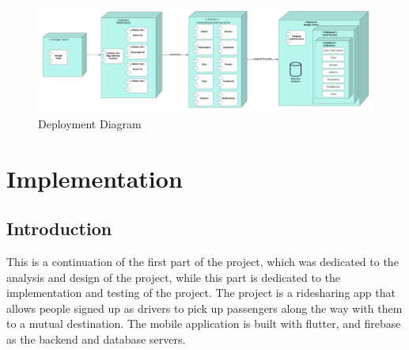 \documentclass[a4paper, 12pt]{report} %
\begin{document}
        \FloatBarrier

        \begin{figure}
            \centering
            \includegraphics[width=\linewidth]{Images/deployment_diagram.png}
            \caption{Deployment Diagram}
            \label{fig:dep_diagram}
        \end{figure}

        \FloatBarrier
        


    \pagebreak
    \section{Implementation}
        \subsection{Introduction}
            This is a continuation of the first part of the project, which was dedicated to the analysis and design of the project, while this part is dedicated to the implementation and testing of the project. The project is a ridesharing app that allows people signed up as drivers to pick up passengers along the way with them to a mutual destination. The mobile application is built with flutter, and firebase as the backend and database servers.
\end{document}
